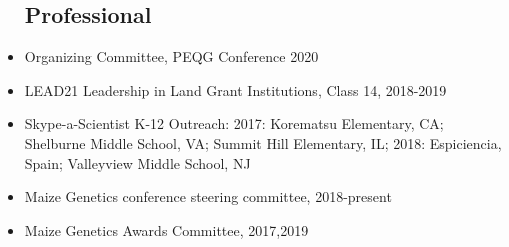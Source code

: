 \begin{itemize}
\subsection*{Professional}
\item Organizing Committee, PEQG Conference 2020
\item LEAD21 Leadership in Land Grant Institutions, Class 14, 2018-2019
\item Skype-a-Scientist K-12 Outreach: 2017: Korematsu Elementary, CA; Shelburne Middle School, VA; Summit Hill Elementary, IL; 2018:  Espiciencia, Spain; Valleyview Middle School, NJ
\item Maize Genetics conference steering committee, 2018-present
\item Maize Genetics Awards Committee, 2017,2019

\end{itemize}
